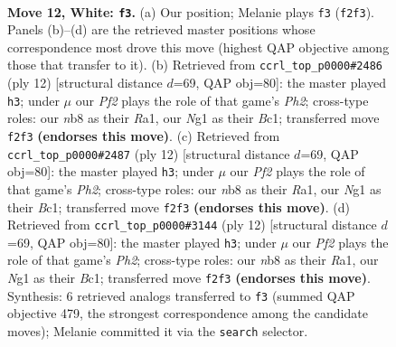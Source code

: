 \documentclass[11pt]{article}
\begin{document}
\begin{figure}[p]
\label{fig:thought-m20}
\end{figure}

\clearpage

\begin{figure}[p]\centering
\begin{subfigure}{0.46\textwidth}\centering
\resizebox{\linewidth}{!}{%
\newchessgame
\chessboard[
  setfen={rnbqkbr1/5p2/1p1p1np1/p1pP4/P3P2p/R1N1B3/1P3PPP/3QKBNR w Kq - 2 12},
  showmover=false,
  pgfstyle=straightmove, color=movearrow, markmove={f2-f3}
]}
\caption{}
\end{subfigure}\hfill
\begin{subfigure}{0.46\textwidth}\centering
\resizebox{\linewidth}{!}{%
\newchessgame
\chessboard[
  setfen={rnbqkb1r/pp3p1p/3p1np1/2pP4/4P3/2N5/PP3PPP/R1BQKBNR w KQkq - 0 7},
  showmover=false,
  pgfstyle=straightmove, color=movearrow, markmove={h2-h3}
]}
\caption{}
\end{subfigure}
\\[4pt]
\begin{subfigure}{0.46\textwidth}\centering
\resizebox{\linewidth}{!}{%
\newchessgame
\chessboard[
  setfen={rnbqkb1r/pp3p1p/3p1np1/2pP4/4P3/2N5/PP3PPP/R1BQKBNR w KQkq - 0 7},
  showmover=false,
  pgfstyle=straightmove, color=movearrow, markmove={h2-h3}
]}
\caption{}
\end{subfigure}\hfill
\begin{subfigure}{0.46\textwidth}\centering
\resizebox{\linewidth}{!}{%
\newchessgame
\chessboard[
  setfen={rnbqkb1r/pp3p1p/3p1np1/2pP4/4P3/2N5/PP3PPP/R1BQKBNR w KQkq - 0 7},
  showmover=false,
  pgfstyle=straightmove, color=movearrow, markmove={h2-h3}
]}
\caption{}
\end{subfigure}
\caption{\textbf{Move 12, White: \texttt{f3}.} (a) Our position; Melanie plays \texttt{f3} (\texttt{f2f3}). Panels (b)--(d) are the retrieved master positions whose correspondence most drove this move (highest QAP objective among those that transfer to it). (b) Retrieved from \texttt{ccrl\_top\_p0000\#2486} (ply 12) [structural distance $d$=69, QAP obj=80]: the master played \texttt{h3}; under $\mu$ our \emph{Pf2} plays the role of that game's \emph{Ph2}; cross-type roles: our \emph{n}b8 as their \emph{R}a1, our \emph{N}g1 as their \emph{B}c1; transferred move \texttt{f2f3} \textbf{(endorses this move)}. (c) Retrieved from \texttt{ccrl\_top\_p0000\#2487} (ply 12) [structural distance $d$=69, QAP obj=80]: the master played \texttt{h3}; under $\mu$ our \emph{Pf2} plays the role of that game's \emph{Ph2}; cross-type roles: our \emph{n}b8 as their \emph{R}a1, our \emph{N}g1 as their \emph{B}c1; transferred move \texttt{f2f3} \textbf{(endorses this move)}. (d) Retrieved from \texttt{ccrl\_top\_p0000\#3144} (ply 12) [structural distance $d$=69, QAP obj=80]: the master played \texttt{h3}; under $\mu$ our \emph{Pf2} plays the role of that game's \emph{Ph2}; cross-type roles: our \emph{n}b8 as their \emph{R}a1, our \emph{N}g1 as their \emph{B}c1; transferred move \texttt{f2f3} \textbf{(endorses this move)}. Synthesis: 6 retrieved analogs transferred to \texttt{f3} (summed QAP objective 479, the strongest correspondence among the candidate moves); Melanie committed it via the \texttt{search} selector.}

\end{figure}
\end{document}
